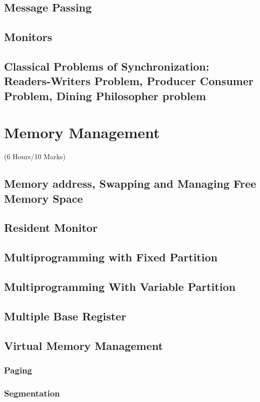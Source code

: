 \documentclass[12pt]{article}
\begin{document}
\subsection{Message Passing}
\subsection{Monitors}
\subsection{Classical Problems of Synchronization: Readers-Writers Problem, Producer Consumer Problem, Dining Philosopher problem}

\pagebreak
\section{Memory Management}
\begin{center}(6 Hours/10 Marks)\end{center}
\subsection{Memory address, Swapping and Managing Free Memory Space}
\subsection{Resident Monitor}
\subsection{Multiprogramming with Fixed Partition}
\subsection{Multiprogramming With Variable Partition}
\subsection{Multiple Base Register}
\subsection{Virtual Memory Management}
\subsubsection{Paging}
\subsubsection{Segmentation}
\end{document}
